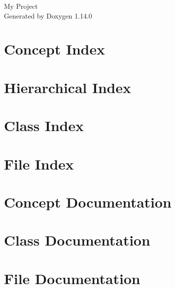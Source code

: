 \documentclass[twoside]{book}
\newcommand{\+}{\discretionary{\mbox{\scriptsize$\hookleftarrow$}}{}{}}
\newcommand{\clearemptydoublepage}{%
    \newpage{\pagestyle{empty}\cleardoublepage}%
  }
\begin{document}
  \raggedbottom
    \hypersetup{pageanchor=false,
                bookmarksnumbered=true,
                pdfencoding=unicode
               }
  \begin{titlepage}
  \vspace*{7cm}
  \begin{center}%
  {\Large My Project}\\
  \vspace*{1cm}
  {\large Generated by Doxygen 1.14.0}\\
  \end{center}
  \end{titlepage}
  \clearemptydoublepage
  \tableofcontents
  \clearemptydoublepage
  \hypersetup{pageanchor=true}
\chapter{Concept Index}

\chapter{Hierarchical Index}

\chapter{Class Index}

\chapter{File Index}

\chapter{Concept Documentation}

\chapter{Class Documentation}







\chapter{File Documentation}

















  \backmatter
  \newpage
  \clearemptydoublepage
  \printindex
\end{document}
